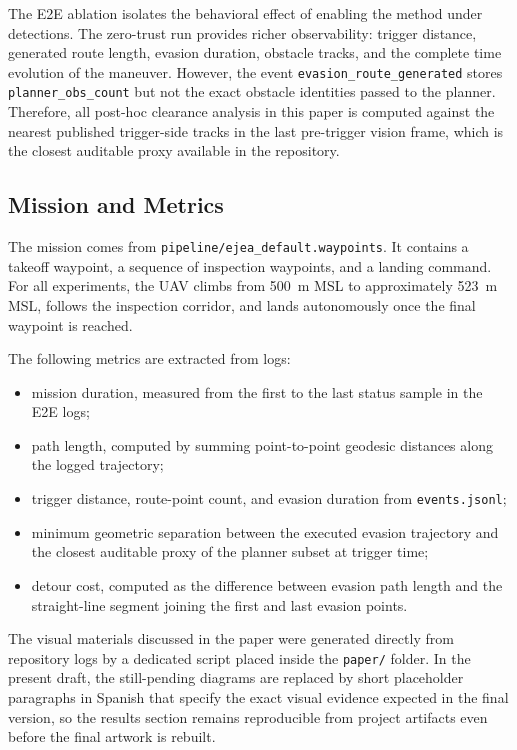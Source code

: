 \documentclass[a4paper,11pt]{article}
\begin{document}
The E2E ablation isolates the behavioral effect of enabling the method under detections. The zero-trust run provides richer observability: trigger distance, generated route length, evasion duration, obstacle tracks, and the complete time evolution of the maneuver. However, the event \texttt{evasion\_route\_generated} stores \texttt{planner\_obs\_count} but not the exact obstacle identities passed to the planner. Therefore, all post-hoc clearance analysis in this paper is computed against the nearest published trigger-side tracks in the last pre-trigger vision frame, which is the closest auditable proxy available in the repository.

\subsection{Mission and Metrics}

The mission comes from \texttt{pipeline/ejea\_default.waypoints}. It contains a takeoff waypoint, a sequence of inspection waypoints, and a landing command. For all experiments, the UAV climbs from \SI{500}{\meter} MSL to approximately \SI{523}{\meter} MSL, follows the inspection corridor, and lands autonomously once the final waypoint is reached.

The following metrics are extracted from logs:
\begin{itemize}[leftmargin=1.3em]
    \item mission duration, measured from the first to the last status sample in the E2E logs;
    \item path length, computed by summing point-to-point geodesic distances along the logged trajectory;
    \item trigger distance, route-point count, and evasion duration from \texttt{events.jsonl};
    \item minimum geometric separation between the executed evasion trajectory and the closest auditable proxy of the planner subset at trigger time;
    \item detour cost, computed as the difference between evasion path length and the straight-line segment joining the first and last evasion points.
\end{itemize}

The visual materials discussed in the paper were generated directly from repository logs by a dedicated script placed inside the \texttt{paper/} folder. In the present draft, the still-pending diagrams are replaced by short placeholder paragraphs in Spanish that specify the exact visual evidence expected in the final version, so the results section remains reproducible from project artifacts even before the final artwork is rebuilt.
\end{document}
